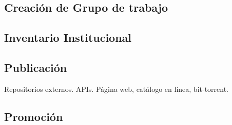 \documentclass[
10pt, %
letterpaper, %
oneside, %
headinclude,footinclude, %
BCOR5mm, %
]{scrartcl}
\begin{document}
\subsection{Creación de Grupo de trabajo}


\subsection{Inventario Institucional}
\cite{_nih_????}

\subsection{Publicación}
Repositorios externos.
APIs.
Página web, catálogo en línea, bit-torrent.

\subsection{Promoción}
\cite{schofield_post-publication_2009}



\renewcommand{\refname}{\spacedlowsmallcaps{References}} %



%


\end{document}
